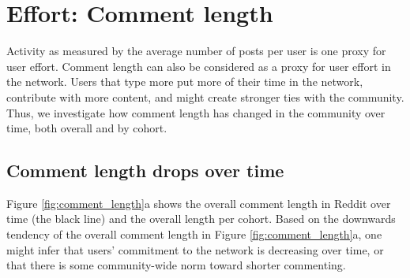 \section{Effort: Comment length}

\begin{figure*}[!tb]
\centering
{}
\caption{Figure (a) shows the average comment length over clock time and Figure (b) from the user-referential time. Both figures show the cohorted trends and the overall users trends.  The overall average length per comment decreases over time, although for any individual cohort, it increases after a sharp initial drop. Figure (c), similar to Figure \ref{fig:avr_posts_per_user_for_surviving_year}, shows the monthly average comment length for active users in the cohorts of 2010, 2011 and 2012, segmented by the number of years that the user survived in the network.  Opposite the analysis for average posts, which showed that low-activity users were the first to leave Reddit, here, people who start out as longer commenters are \textit{more} likely to leave.}
\label{fig:comment_length}
\end{figure*}

Activity as measured by the average number of posts per user is one proxy for user effort.  Comment length can also be considered as a proxy for user effort in the network.  Users that type more put more of their time in the network, contribute with more content, and might create stronger ties with the community.  Thus, we investigate how comment length has changed in the community over time, both overall and by cohort. 

\subsection{Comment length drops over time}

Figure \ref{fig:comment_length}a shows the overall comment length in Reddit over time (the black line) and the overall length per cohort. 
Based on the downwards tendency of the overall comment length in Figure \ref{fig:comment_length}a, one might infer that users' commitment to the network is decreasing over time, or that there is some community-wide norm toward shorter commenting. 

